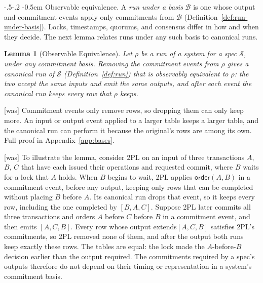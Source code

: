 \documentclass[sigconf]{cidr-2027}
\makeatletter
\newtheorem{lemma}{Lemma}
\theoremstyle{remark}
\renewcommand\paragraph{\@startsection{paragraph}{4}{\z@}%
  {-.5\baselineskip \@plus -2\p@ \@minus -.2\p@}%
  {-0.5em}%
  {\normalfont\bfseries}}
\newcommand{\commitment}{commitment\xspace}
\newcommand{\commitments}{commitments\xspace}
\newcommand{\Commitment}{Commitment\xspace}
\newcommand{\outrel}{extends\xspace}          %
\newcommand{\Spec}{\mathcal{S}}
\makeatother
\begin{document}
\paragraph{Observable equivalence.}
\color{blue!70!black}A \emph{run under a basis} $\mathcal B$ is one whose output and
\commitment events apply only \commitments from $\mathcal B$
(Definition~\ref{def:run-under-basis}).  Locks, timestamps, quorums, and
consensus differ in how and when they decide.  The next lemma relates runs
under any such basis to canonical runs.\color{black}

\begin{lemma}[Observable Equivalence]
\label{lem:canonical-equivalent}
Let $\rho$ be a run of a system for a spec $\Spec$, under any \commitment
basis.  Removing the \commitment events from $\rho$ gives a canonical run of
$\Spec$ (Definition~\ref{def:run}) that is \emph{observably equivalent} to
$\rho$: the two accept the same inputs and emit the same outputs, and after each
event the canonical run keeps every row that $\rho$ keeps.
\end{lemma}



{\footnotesize\color{black!50}\noindent\textsf{[was]} \Commitment events only remove rows, so dropping them can only keep more.  An
input or output event applied to a larger table keeps a larger table, and the
canonical run can
perform it because the original's rows are among its own.  Full proof in
Appendix~\ref{app:bases}.\par}



{\footnotesize\color{black!50}\noindent\textsf{[was]} To illustrate the lemma, consider 2PL on an input of three transactions
$A$, $B$, $C$ that have each issued their operations and requested commit,
where $B$ waits for a lock that $A$ holds.  When $B$ begins to wait, 2PL applies
$\mathsf{order}(A,B)$ in a \commitment event, before any output, keeping only
rows that can be completed without placing $B$ before $A$.  Its canonical run
drops that event, so it keeps every row, including the one completed by
$[B,A,C]$.  Suppose 2PL later commits all three transactions and orders $A$
before $C$ before $B$ in a \commitment event, and then emits $[A,C,B]$.  Every
row whose output \outrel $[A,C,B]$ satisfies 2PL's \commitments, so 2PL
removed none of them, and after the output both runs keep exactly these rows.
The tables are equal: the lock made the $A$-before-$B$ decision
earlier than the output required.  The \commitments required by a spec's outputs
therefore do not depend on their timing or representation in a system's
\commitment basis.\par}
\end{document}
